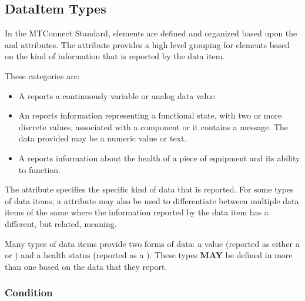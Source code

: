 \subsection{DataItem Types} \label{sec:DataItem Types}


In the MTConnect Standard,  elements are defined and organized based upon the  and  attributes.  The  attribute provides a high level grouping for  elements based on the kind of information that is reported by the data item.

These categories are:

\begin{itemize}

\item {}

A  reports a continuously variable or analog data value. 

\item {}

An  reports information representing a functional state, with two or more discrete values, associated with a component or it contains a message.  The data provided may be a numeric value or text.

\item {}

A  reports information about the health of a piece of equipment and its ability to function.
\end{itemize}

The  attribute specifies the specific kind of data that is reported.   For some types of data items, a  attribute may also be used to differentiate between multiple data items of the same  where the information reported by the data item has a different, but related, meaning.

Many types of data items provide two forms of data: a value (reported as either a  or ) and a health status (reported as a ).  These  types \textbf{MAY} be defined in more than one  based on the data that they report.



\subsubsection{Condition}
\label{sec:Condition}



